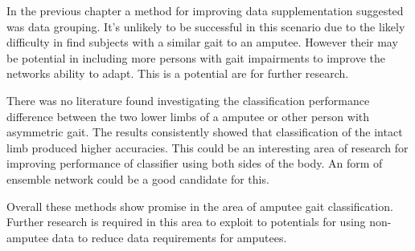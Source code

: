 In the previous chapter a method for improving data supplementation suggested was data grouping. It's unlikely to be successful in this scenario due to the likely difficulty in find subjects with a similar gait to an amputee. However their may be potential in including more persons with gait impairments to improve the networks ability to adapt. This is a potential are for further research.

There was no literature found investigating the classification performance difference between the two lower limbs of a amputee or other person with asymmetric gait. The results consistently showed that classification of the intact limb produced higher accuracies. This could be an interesting area of research for improving performance of classifier using both sides of the body. An form of ensemble network could be a good candidate for this.

Overall these methods show promise in the area of amputee gait classification. Further research is required in this area to exploit to potentials for using non-amputee data to reduce data requirements for amputees.
